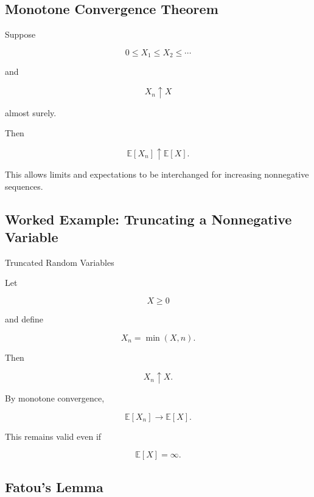 \subsection{Monotone Convergence Theorem}
\label{subsec:mct-probability}

\begin{theorem}
Suppose

\[
0\leq X_1\leq X_2\leq\cdots
\]

and

\[
X_n\uparrow X
\]

almost surely.

Then

\[
\boxed{
\mathbb{E}[X_n]
\uparrow
\mathbb{E}[X].
}
\]
\end{theorem}

This allows limits and expectations to be interchanged for increasing
nonnegative sequences.

\subsection{Worked Example: Truncating a Nonnegative Variable}
\label{subsec:worked-mct-truncation}

\begin{workedexamplebox}{Truncated Random Variables}

Let

\[
X\geq0
\]

and define

\[
X_n
=
\min(X,n).
\]

Then

\[
X_n\uparrow X.
\]

By monotone convergence,

\begin{answerbox}
\[
\boxed{
\mathbb{E}[X_n]
\to
\mathbb{E}[X].
}
\]
\end{answerbox}

This remains valid even if

\[
\mathbb{E}[X]=\infty.
\]

\end{workedexamplebox}

\subsection{Fatou's Lemma}
\label{subsec:fatou-probability}

